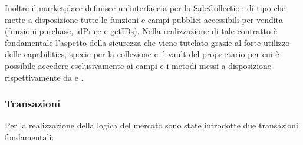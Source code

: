 Inoltre il marketplace definisce un'interfaccia per la SaleCollection di tipo  che mette a disposizione tutte le funzioni e campi pubblici accessibili per vendita (funzioni purchase, idPrice e getIDs). Nella realizzazione di tale contratto è fondamentale l'aspetto della sicurezza che viene tutelato grazie al forte utilizzo delle capabilities, specie per la collezione e il vault del proprietario per cui è possibile accedere esclusivamente ai campi e i metodi messi a disposizione rispettivamente da  e .

\subsubsection{Transazioni}
Per la realizzazione della logica del mercato sono state introdotte due transazioni fondamentali:
